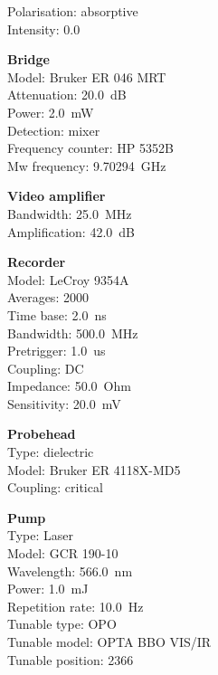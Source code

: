 \documentclass{article}
\begin{document}
\begin{multicols}{2}
\begin{minipage}{.49\textwidth}
								Polarisation: absorptive
			\\
								Intensity: 0.0~
			\\
				\end{minipage}
	\begin{minipage}{.49\textwidth}
	\textbf{Bridge}\\
						Model: Bruker ER 046 MRT
			\\
													Attenuation: 20.0~dB
			\\
								Power: 2.0~mW
			\\
								Detection: mixer
			\\
								Frequency counter: HP 5352B
			\\
								Mw frequency: 9.70294~GHz
			\\
				\end{minipage}
	\begin{minipage}{.49\textwidth}
	\textbf{Video amplifier}\\
						Bandwidth: 25.0~MHz
			\\
								Amplification: 42.0~dB
			\\
				\end{minipage}
	\begin{minipage}{.49\textwidth}
	\textbf{Recorder}\\
						Model: LeCroy 9354A
			\\
								Averages: 2000
			\\
								Time base: 2.0~ns
			\\
								Bandwidth: 500.0~MHz
			\\
								Pretrigger: 1.0~us
			\\
								Coupling: DC
			\\
								Impedance: 50.0~Ohm
			\\
								Sensitivity: 20.0~mV
			\\
				\end{minipage}
	\begin{minipage}{.49\textwidth}
	\textbf{Probehead}\\
						Type: dielectric
			\\
								Model: Bruker ER 4118X-MD5
			\\
								Coupling: critical
			\\
				\end{minipage}
	\begin{minipage}{.49\textwidth}
	\textbf{Pump}\\
						Type: Laser
			\\
								Model: GCR 190-10
			\\
								Wavelength: 566.0~nm
			\\
								Power: 1.0~mJ
			\\
								Repetition rate: 10.0~Hz
			\\
								Tunable type: OPO
			\\
								Tunable model: OPTA BBO VIS/IR
			\\
													Tunable position: 2366
			\\
									\end{minipage}
\end{multicols}
\end{document}

